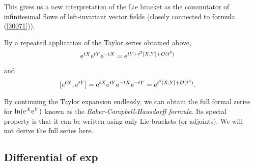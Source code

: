 This gives us a new interpretation of the Lie bracket as the  commutator of infinitesimal flows of left-invariant vector fields (closely connected to formula (\ref{30071})).
\begin{cor}
    By a repeated application of the Taylor series obtained above,
    \[\mathrm{e}^{tX}\mathrm{e}^{tY}\mathrm{e}^{-tX}=\mathrm{e}^{tY+t^2[X,Y]+\mathcal{O}(t^3)}\]
    and
    \[[\mathrm{e}^{tX},\mathrm{e}^{tY}]=\mathrm{e}^{tX}\mathrm{e}^{tY}\mathrm{e}^{-tX}\mathrm{e}^{-tY}=\mathrm{e}^{t^2[X,Y]+\mathcal{O}(t^3)}.\]
\end{cor}


\begin{rem}
    By continuing the Taylor expansion endlessly, we can obtain the full formal zeries for $\ln(\mathrm{e}^X \mathrm{e}^Y)$ known as the \emph{Baker-Campbell-Hausdorff formula}. Its special property is that it can be written using only Lie brackets (or adjoints). We will not derive the full series here.
\end{rem}










\subsection{Differential of exp}

